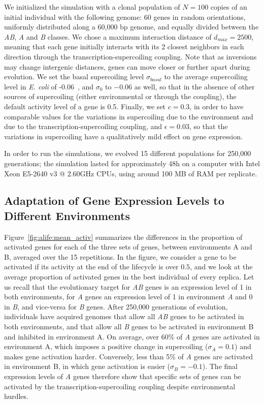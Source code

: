 We initialized the simulation with a clonal population of $N=100$ copies of an initial individual with the following genome: 60 genes in random orientations, uniformly distributed along a 60,000 bp genome, and equally divided between the \emph{AB}, \emph{A} and \emph{B} classes.
We chose a maximum interaction distance of $d_{max} = 2500$, meaning that each gene initially interacts with its 2 closest neighbors in each direction through the transcription-supercoiling coupling.
Note that as inversions may change intergenic distances, genes can move closer or further apart during evolution.
We set the basal supercoiling level $\sigma_{basal}$ to the average supercoiling level in \emph{E. coli} of -0.06~\citep{crozat2005}, and $\sigma_0$ to $-0.06$ as well, so that in the absence of other sources of supercoiling (either environmental or through the coupling), the default activity level of a gene is 0.5.
Finally, we set $c = 0.3$, in order to have comparable values for the variations in supercoiling due to the environment and due to the transcription-supercoiling coupling, and $\epsilon=0.03$, so that the variations in supercoiling have a qualitatively mild effect on gene expression.


In order to run the simulations, we evolved 15 different populations for 250,000 generations; the simulation lasted for approximately 48h on a computer with Intel Xeon E5-2640 v3 @ 2.60GHz CPUs, using around 100 MB of RAM per replicate.


\subsection{Adaptation of Gene Expression Levels to Different Environments}

Figure~\ref{fig:alife:mean_activ} summarizes the differences in the proportion of activated genes for each of the three sets of genes, between environments A and B, averaged over the 15 repetitions.
In the figure, we consider a gene to be activated if its activity at the end of the lifecycle is over $0.5$, and we look at the average proportion of activated genes in the best individual of every replica.
Let us recall that the evolutionary target for \emph{AB} genes is an expression level of 1 in both environments, for \emph{A} genes an expression level of 1 in environment \emph{A} and 0 in \emph{B}, and vice-versa for \emph{B} genes.
After 250,000 generations of evolution, individuals have acquired genomes that allow all \emph{AB} genes to be activated in both environments, and that allow all \emph{B} genes to be activated in environment B and inhibited in environment A.
On average, over 60\% of \emph{A} genes are activated in environment A, which imposes a positive change in supercoiling ($\sigma_A = 0.1$) and makes gene activation harder.
Conversely, less than 5\% of \emph{A} genes are activated in environment B, in which gene activation is easier ($\sigma_B = -0.1$).
The final expression levels of \emph{A} genes therefore show that specific sets of genes can be activated by the transcription-supercoiling coupling despite environmental hurdles.

